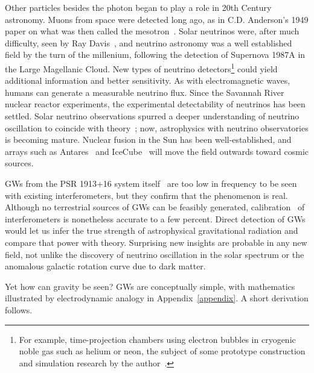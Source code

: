 Other particles besides the photon began to play a role in 20th Century astronomy.
Muons from space were detected long ago, as in C.D. Anderson's 1949 paper on what was then called the mesotron~\cite{CDAnderson}. 
Solar neutrinos were, after much difficulty, seen by Ray Davis~\cite{NeutrinoReview}, and neutrino astronomy was a well established field by the turn of the millenium, following the detection of Supernova 1987A in the Large Magellanic Cloud. 
New types of neutrino detectors\footnote{For example, time-projection chambers using electron bubbles in cryogenic noble gas such as helium or neon, the subject of some prototype construction and simulation research by the author~\cite{EBubble2005,MeadorsNevis2006}.} could yield additional information and better sensitivity.
As with electromagnetic waves, humans can generate a measurable neutrino flux. 
Since the Savannah River nuclear reactor experiments, the experimental detectability of neutrinos has been settled.
Solar neutrino observations spurred a deeper understanding of neutrino oscillation to coincide with theory~\cite{NeutrinosSolarTheoretical}; now, astrophysics with neutrino observatories is becoming mature.
Nuclear fusion in the Sun has been well-established, and arrays such as Antares~\cite{Antares2013} and IceCube~\cite{Aartsen2014} will move the field outwards toward cosmic sources.


 GWs from the PSR 1913+16 system itself~\cite{WeisbergTaylor2004} are too low in frequency to be seen with existing interferometers, but they confirm that the phenomenon is real.
Although no terrestrial sources of GWs can be feasibly generated, calibration~\cite{AbadieCalibration2010} of interferometers is nonetheless accurate to a few percent.
Direct detection of GWs would let us infer the true strength of astrophysical gravitational radiation and compare that power with theory. 
Surprising new insights are probable in any new field, not unlike the discovery of neutrino oscillation in the solar spectrum or the anomalous galactic rotation curve due to dark matter.

Yet how can gravity be seen?
GWs are conceptually simple, with mathematics illustrated by electrodynamic analogy in Appendix~\ref{appendix}.
A short derivation follows.




